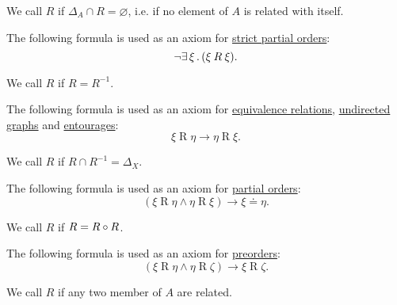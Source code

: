 \begin{definition}
\begin{thmenum}[resume=def:binary_relation]
     We call \( R \)  if \( \Delta_A \cap R = \varnothing \), i.e. if no element of \( A \) is related with itself.

    The following formula is used as an axiom for \hyperref[thm:strict_partial_order]{strict partial orders}:
    \begin{equation}\label{eq:def:binary_relation/irreflexive}
      \neg \exists \thinspace \xi \thinspace . \thinspace (\xi \mathbin{R} \xi).
    \end{equation}

     We call \( R \)  if \( R = R^{-1} \).

    The following formula is used as an axiom for \hyperref[def:equivalence_relation]{equivalence relations}, \hyperref[def:undirected_multigraph]{undirected graphs} and \hyperref[def:entourage]{entourages}:
    \begin{equation}\label{eq:def:binary_relation/symmetric}
      \xi \mathbin{R} \eta \rightarrow \eta \mathbin{R} \xi.
    \end{equation}

     We call \( R \)  if \( R \cap R^{-1} = \Delta_X \).

    The following formula is used as an axiom for \hyperref[def:partially_ordered_set]{partial orders}:
    \begin{equation}\label{eq:def:binary_relation/antisymmetric}
      (\xi \mathbin{R} \eta \wedge \eta \mathbin{R} \xi) \rightarrow \xi \doteq \eta.
    \end{equation}

     We call \( R \)  if \( R = R \bincirc R \).

    The following formula is used as an axiom for \hyperref[def:partially_ordered_set]{preorders}:
    \begin{equation}\label{eq:def:binary_relation/transitive}
      (\xi \mathbin{R} \eta \wedge \eta \mathbin{R} \zeta) \rightarrow \xi \mathbin{R} \zeta.
    \end{equation}

     We call \( R \)  if any two member of \( A \) are related.


\end{thmenum}
\end{definition}

